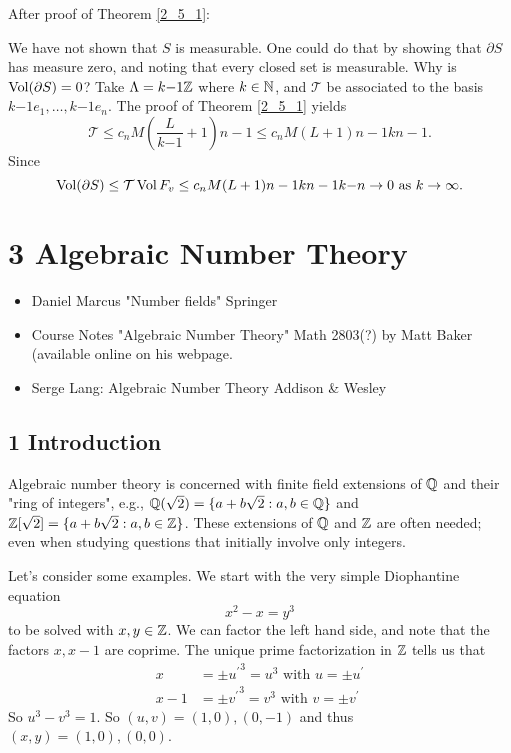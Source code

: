 \documentclass[NumTh.tex]{subfiles}
\begin{document}
After proof of Theorem \ref{2_5_1}:

\begin{rem}
  We have not shown that $S$ is measurable.
  One could do that by showing that $\partial S$ has measure zero, and noting that every closed set is measurable.
  Why is $\operatorname{Vol}(\partial S) = 0$?
  Take $\Lambda = k{-1} \mathbb{Z}$ where $k \in \mathbb{N}$, and $\mathcal{T}$ be associated to the basis $k{-1} e_1, \dots, k{-1}e_n$.
  The proof of Theorem \ref{2_5_1} yields
  \[ \mathcal{T} \leq c_n M \left( \frac{L}{k{-1}} + 1 \right){n-1} \leq c_n M (L+1){n-1} k{n-1} \text{.} \]
  Since 
  \[\operatorname{Vol}(\partial S) \leq \mathcal{T} \operatorname{Vol} F_v \leq c_n M (L+1){n-1} k{n-1} k{-n} \to 0 \text{ as } k \to \infty \text{.} \]
\end{rem}

\section{3 Algebraic Number Theory}

\begin{rem}[References]
  \begin{itemize}
    \item Daniel Marcus "Number fields" Springer
    \item Course Notes "Algebraic Number Theory" Math 2803(?) by Matt Baker (available online on his webpage.
    \item Serge Lang: Algebraic Number Theory Addison \& Wesley
  \end{itemize}
\end{rem}

\subsection{1 Introduction}

Algebraic number theory is concerned with finite field extensions of $\mathbb{Q}$ and their "ring of integers",
e.g., $\mathbb{Q}(\sqrt{2}) = \{a + b\sqrt{2}: a,b\in \mathbb{Q} \}$ and $\mathbb{Z}[\sqrt{2}] = \{ a + b \sqrt{2} : a,b \in \mathbb{Z} \}$.
These extensions of $\mathbb{Q}$ and $\mathbb{Z}$ are often needed; even when studying questions that initially involve only integers.

Let's consider some examples.
We start with the very simple Diophantine equation
\[ x^2 -x = y^3 \]
to be solved with $x,y \in \mathbb{Z}$.
We can factor the left hand side, and note that the factors $x, x-1$ are coprime.
The unique prime factorization in $\mathbb{Z}$ tells us that 
\begin{align*}
  x &= \pm {u^\prime}^3 = u^3 \text{ with } u = \pm u^\prime\\
  x -1 &= \pm {v^\prime}^3 = v^3 \text{ with } v = \pm v^\prime
\end{align*}
So $u^3 - v^3 = 1$.
So $(u,v) = (1,0), (0,-1)$ and thus $(x,y) = (1,0), (0,0)$.\\
\end{document}
